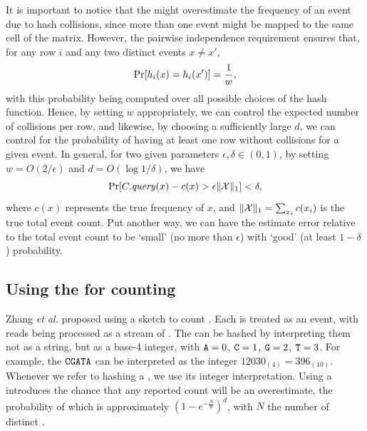 It is important to notice that the \cm might overestimate the frequency of an event due to hash collisions, since more than one event might be mapped to the same cell of the matrix. However, the pairwise independence requirement ensures that, for any row $i$ and any two distinct events $x\neq x'$,
\begin{equation*}
\mathrm{Pr}[h_i(x)=h_i(x')] = \frac{1}{w},
\end{equation*}
with this probability being computed over all possible choices of the hash function.
Hence, by setting $w$ appropriately, we can control the expected number of collisions per row, and likewise, by choosing a sufficiently large $d$, we can control for the probability of having at least one row without collisions for a given event. In general, for two given parameters $\epsilon, \delta \in (0,1)$, by setting 
$w=O(2/\epsilon)$ and $d=O(\log1/\delta)$, we have
\begin{equation}
\label{eq:cm-prob}
\prob[C.\mathit{query}(x) - c(x) > \epsilon \|\strsetname{X}\|_1] < \delta,
\end{equation}
where $c(x)$ represents the true frequency of $x$, and $\|\strsetname{X}\|_1=\sum_{x_i}c(x_i)$ is the true total event count. Put another way, we can have the estimate error relative to the total event count to be `small' (no more than $\epsilon$) with `good' (at least $1-\delta$) probability.

\subsection{Using the \cm for counting }
\label{subsec:cm-countingkmers}

Zhang \emph{et al.} proposed using a \cm sketch to count  \cite{Zhang2014}. Each \kmer is treated as an event, with reads being processed as a stream of . The  can be hashed by interpreting them not as a string, but as a base-4 integer, with $\mathtt{A}=0$, $\mathtt{C}=1$, $\mathtt{G}=2$, $\mathtt{T}=3$. For example, the \kmer $\mathtt{C}\mathtt{G}\mathtt{A}\mathtt{T}\mathtt{A}$ can be interpreted as the integer $12030_{(4)} = 396_{(10)}$. Whenever we refer to hashing a \kmer, we use its integer interpretation. Using a \cm introduces the chance that any reported count will be an overestimate, the probability of which is approximately $(1-e^{-\frac{N}{w}})^d$, with $N$ the number of distinct  \cite{Zhang2014}.



